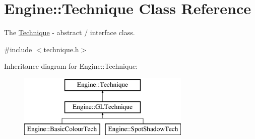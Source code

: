 \hypertarget{classEngine_1_1Technique}{}\section{Engine\+:\+:Technique Class Reference}
\label{classEngine_1_1Technique}


The \hyperlink{classEngine_1_1Technique}{Technique} -\/ abstract / interface class.  




{\ttfamily \#include $<$technique.\+h$>$}

Inheritance diagram for Engine\+:\+:Technique\+:\begin{figure}[H]
\begin{center}
\leavevmode
\includegraphics[height=3.000000cm]{classEngine_1_1Technique}
\end{center}
\end{figure}
